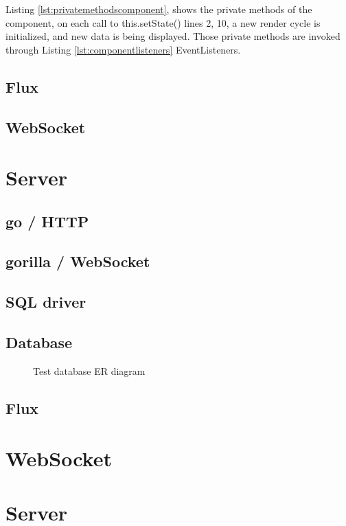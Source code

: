 


Listing \ref{lst:privatemethodscomponent}, shows the private methods of the component, on each call to this.setState() lines 2, 10, a new render cycle is initialized, and new data is being displayed. Those private methods are invoked through Listing \ref{lst:componentlisteners} EventListeners.

\subsection{Flux}
\subsection{WebSocket}

\section{Server}
\subsection{go / HTTP}
\subsection{gorilla / WebSocket}
\subsection{SQL driver}
\subsection{Database}

\begin{figure}[h]
  \centering
  \caption{Test database ER diagram}
  \label{fig:groupmanagement}
\end{figure}

\subsection{Flux}

\section{WebSocket}

\section{Server}


